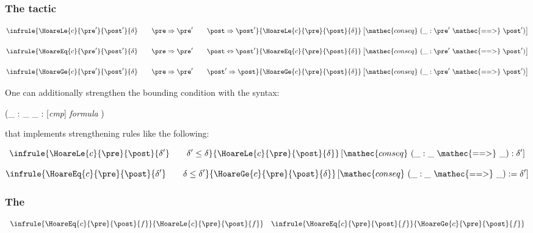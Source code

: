 \subsubsection*{The  tactic}


\begin{displaymath}
\infrule{
  \HoareLe{c}{\pre'}{\post'}{\delta} \qquad \pre\Rightarrow\pre' \qquad  \post\Rightarrow\post'
}{
  \HoareLe{c}{\pre}{\post}{\delta}
}\left[\mathec{conseq}~ (\_ : \pre'~ \mathec{==>}~ \post') \right]
\end{displaymath}

\begin{displaymath}
\infrule{
  \HoareEq{c}{\pre'}{\post'}{\delta} \qquad \pre\Rightarrow\pre' \qquad  \post\Leftrightarrow\post'
}{
  \HoareEq{c}{\pre}{\post}{\delta}
}\left[\mathec{conseq}~ (\_ : \pre'~ \mathec{==>}~ \post') \right]
\end{displaymath}

\begin{displaymath}
\infrule{
  \HoareGe{c}{\pre'}{\post'}{\delta} \qquad \pre\Rightarrow\pre' \qquad  \post'\Rightarrow\post
}{
  \HoareGe{c}{\pre}{\post}{\delta}
}\left[\mathec{conseq}~ (\_ : \pre'~ \mathec{==>}~ \post') \right]
\end{displaymath}


One can additionally strengthen the bounding condition with the syntax:

 (\_ : \_ \rawec{==>} \_ : [\textit{cmp}]
\textit{formula} ) 

that implements strengthening rules like the following:

\begin{displaymath}
\infrule{
  \HoareLe{c}{\pre}{\post}{\delta'} \qquad \delta'\leq\delta 
}{
  \HoareLe{c}{\pre}{\post}{\delta}
}\left[\mathec{conseq}~ (\_ : \_ ~\mathec{==>}~ \_) : \delta' \right]
\end{displaymath}

\begin{displaymath}
\infrule{
  \HoareEq{c}{\pre}{\post}{\delta'} \qquad \delta\leq\delta' 
}{
  \HoareGe{c}{\pre}{\post}{\delta}
}\left[\mathec{conseq}~ (\_ : \_ ~\mathec{==>}~ \_) : = \delta' \right]
\end{displaymath}



\subsubsection*{The }
%
\Syntax {}
\begin{displaymath}
\begin{array}{cc}
\infrule{
  \HoareEq{c}{\pre}{\post}{f}
}{
  \HoareLe{c}{\pre}{\post}{f}
}
&
\infrule{
  \HoareEq{c}{\pre}{\post}{f}
}{
  \HoareGe{c}{\pre}{\post}{f}
}
\end{array}
\end{displaymath}


